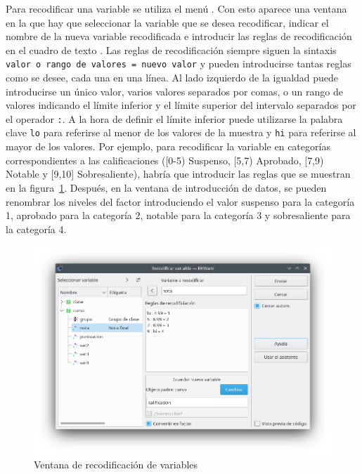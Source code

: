 Para recodificar una variable se utiliza el menú .
Con esto aparece una ventana en la que hay que seleccionar la variable que se desea recodificar, indicar el nombre de la
nueva variable recodificada e introducir las reglas de recodificación en el cuadro de texto .
Las reglas de recodificación siempre siguen la sintaxis \lstinline{valor o rango de valores = nuevo valor} y pueden
introducirse tantas reglas como se desee, cada una en una línea.
Al lado izquierdo de la igualdad puede introducirse un único valor, varios valores separados por comas, o un rango de
valores indicando el límite inferior y el límite superior del intervalo separados por el operador \lstinline{:}.
A la hora de definir el límite inferior puede utilizarse la palabra clave \lstinline{lo} para referirse al menor de los
valores de la muestra y \lstinline{hi} para referirse al mayor de los valores.
Por ejemplo, para recodificar la variable  en categorías correspondientes a las calificaciones ([0-5)
Suspenso, [5,7) Aprobado, [7,9) Notable y [9,10] Sobresaliente), habría que introducir las reglas que se muestran en la
figura~\ref{g:recodificar_variable}. Después, en la ventana de introducción de datos, se pueden renombrar los niveles
del factor introduciendo el valor suspenso para la categoría 1, aprobado para la categoría 2, notable para la categoría
3 y sobresaliente para la categoría 4. 

\begin{figure}[htp]
\begin{center}
  \includegraphics[scale=0.6]{capitulos/introduccion/img/recodificar}
  \caption{Ventana de recodificación de variables}
  \label{g:recodificar_variable}
\end{center}
\end{figure} 


